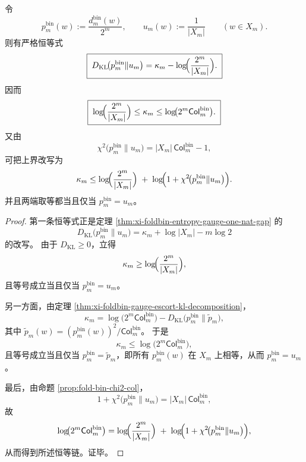 \begin{theorem}\label{thm:xi-foldbin-kappa-kl-collision-identity-chain}
令
\[
p_m^{\mathrm{bin}}(w):=\frac{d_m^{\mathrm{bin}}(w)}{2^m},
\qquad
u_m(w):=\frac{1}{|X_m|}
\qquad (w\in X_m).
\]
则有严格恒等式
\[
\boxed{\;
D_{\mathrm{KL}}\!\bigl(p_m^{\mathrm{bin}}\|u_m\bigr)
=
\kappa_m-\log\!\Bigl(\frac{2^m}{|X_m|}\Bigr).\;}
\]
因而
\[
\boxed{\;
\log\!\Bigl(\frac{2^m}{|X_m|}\Bigr)
\le
\kappa_m
\le
\log\!\bigl(2^m\mathsf{Col}^{\mathrm{bin}}_m\bigr).\;}
\]
又由
\[
\chi^2\!\bigl(p_m^{\mathrm{bin}}\|u_m\bigr)
=
|X_m|\,\mathsf{Col}^{\mathrm{bin}}_m-1,
\]
可把上界改写为
\[
\kappa_m
\le
\log\!\Bigl(\frac{2^m}{|X_m|}\Bigr)
\;+\;
\log\!\Bigl(1+\chi^2\!\bigl(p_m^{\mathrm{bin}}\|u_m\bigr)\Bigr).
\]
并且两端取等都当且仅当 \(p_m^{\mathrm{bin}}=u_m\)。
\end{theorem}
\begin{proof}
第一条恒等式正是定理 \ref{thm:xi-foldbin-entropy-gauge-one-nat-gap} 的
\[
D_{\mathrm{KL}}\!\bigl(p_m^{\mathrm{bin}}\|u_m\bigr)
=
\kappa_m+\log|X_m|-m\log 2
\]
的改写。
由于 \(D_{\mathrm{KL}}\ge 0\)，立得
\[
\kappa_m\ge \log\!\Bigl(\frac{2^m}{|X_m|}\Bigr),
\]
且等号成立当且仅当 \(p_m^{\mathrm{bin}}=u_m\)。

另一方面，由定理 \ref{thm:xi-foldbin-gauge-escort-kl-decomposition}，
\[
\kappa_m
=
\log\!\bigl(2^m\mathsf{Col}^{\mathrm{bin}}_m\bigr)
-D_{\mathrm{KL}}\!\bigl(p_m^{\mathrm{bin}}\|\widetilde p_m\bigr),
\]
其中 \(\widetilde p_m(w)=(p_m^{\mathrm{bin}}(w))^2/\mathsf{Col}^{\mathrm{bin}}_m\)。
于是
\[
\kappa_m\le \log\!\bigl(2^m\mathsf{Col}^{\mathrm{bin}}_m\bigr),
\]
且等号成立当且仅当 \(p_m^{\mathrm{bin}}=\widetilde p_m\)，即所有 \(p_m^{\mathrm{bin}}(w)\) 在 \(X_m\) 上相等，从而 \(p_m^{\mathrm{bin}}=u_m\)。

最后，由命题 \ref{prop:fold-bin-chi2-col}，
\[
1+\chi^2\!\bigl(p_m^{\mathrm{bin}}\|u_m\bigr)
=
|X_m|\,\mathsf{Col}^{\mathrm{bin}}_m,
\]
故
\[
\log\!\bigl(2^m\mathsf{Col}^{\mathrm{bin}}_m\bigr)
=
\log\!\Bigl(\frac{2^m}{|X_m|}\Bigr)
\;+\;
\log\!\Bigl(1+\chi^2\!\bigl(p_m^{\mathrm{bin}}\|u_m\bigr)\Bigr),
\]
从而得到所述恒等链。证毕。
\end{proof}


